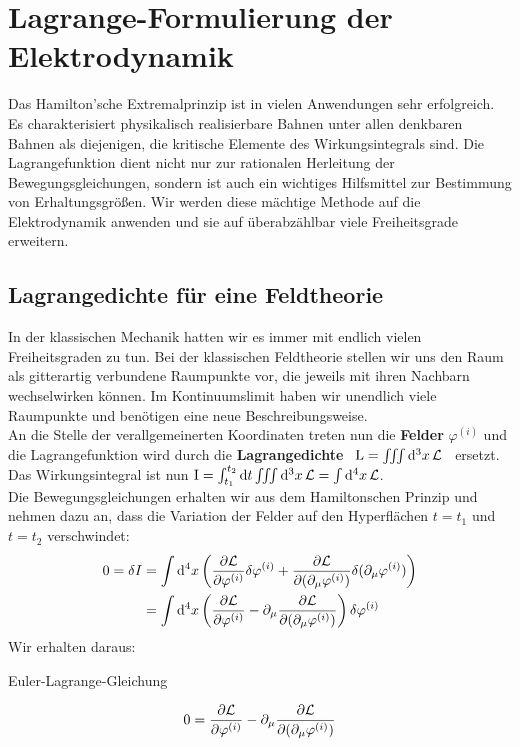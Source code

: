 \section{Lagrange-Formulierung der Elektrodynamik}
Das Hamilton'sche Extremalprinzip ist in vielen Anwendungen sehr erfolgreich. Es charakterisiert physikalisch realisierbare Bahnen unter allen denkbaren Bahnen als diejenigen, die kritische Elemente des Wirkungsintegrals sind. Die Lagrangefunktion dient nicht nur zur rationalen Herleitung der Bewegungsgleichungen, sondern ist auch ein wichtiges Hilfsmittel zur Bestimmung von Erhaltungsgrößen.
Wir werden diese mächtige Methode auf die Elektrodynamik anwenden und sie auf überabzählbar viele Freiheitsgrade erweitern.

\subsection{Lagrangedichte für eine Feldtheorie}
In der klassischen Mechanik hatten wir es immer mit endlich vielen Freiheitsgraden zu tun. Bei der klassischen Feldtheorie stellen wir uns den Raum als gitterartig verbundene Raumpunkte vor, die jeweils mit ihren Nachbarn wechselwirken können. Im Kontinuumslimit haben wir unendlich viele Raumpunkte und benötigen eine neue Beschreibungsweise. \\
An die Stelle der verallgemeinerten Koordinaten treten nun die \textbf{Felder} $\varphi^{(i)}$ und die Lagrangefunktion wird durch die \textbf{Lagrangedichte} \  $\text{L}=\iiint \dd[3]{x}  \mathcal{L}$ \ ersetzt. \\
Das Wirkungsintegral ist nun $\text{I}=\int_{t_1}^{t_2} \dd{t} \iiint \dd[3]{x}  \mathcal{L} = \int \dd[4]{x} \mathcal{L}$. \\
Die Bewegungsgleichungen erhalten wir aus dem Hamiltonschen Prinzip und nehmen dazu an, dass die Variation der Felder auf den Hyperflächen $t=t_1$ und $t=t_2$ verschwindet:
\begin{align*}
0 = \delta I &= \int \dd[4]{x} \left( \frac{\partial\mathcal{L}}{\partial\varphi^{(i)}} \delta\varphi^{(i)} + \frac{\partial\mathcal{L}}{\partial(\partial_{\mu}\varphi^{(i)})} \delta(\partial_{\mu}\varphi^{(i)}) \right) \\
 				 &= \int \dd[4]{x} \left(\frac{\partial\mathcal{L}}{\partial\varphi^{(i)}} - \partial_{\mu} \frac{\partial\mathcal{L}}{\partial(\partial_{\mu}\varphi^{(i)})} \right) \delta\varphi^{(i)}
\end{align*}
Wir erhalten daraus:
\begin{mybox}{Euler-Lagrange-Gleichung}

\begin{align}
0=\frac{\partial\mathcal{L}}{\partial\varphi^{(i)}} - \partial_{\mu} \frac{\partial\mathcal{L}}{\partial(\partial_{\mu}\varphi^{(i)})}
\end{align}

\end{mybox}

